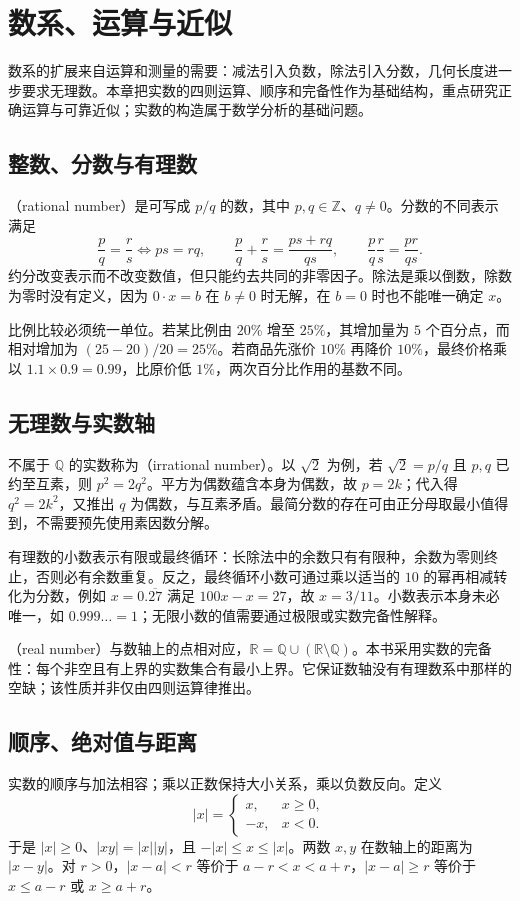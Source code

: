 \documentclass[UTF8]{ctexbook}
\begin{document}
\chapter{数系、运算与近似}
\label{chap:em-numbers}
数系的扩展来自运算和测量的需要：减法引入负数，除法引入分数，几何长度进一步要求无理数。本章把实数的四则运算、顺序和完备性作为基础结构，重点研究正确运算与可靠近似；实数的构造属于数学分析的基础问题。

\section{整数、分数与有理数}
（rational number）是可写成 $p/q$ 的数，其中 $p,q\in\mathbb Z$、$q\ne0$。分数的不同表示满足
\[
 \frac pq=\frac rs\Longleftrightarrow ps=rq,\qquad
 \frac pq+\frac rs=\frac{ps+rq}{qs},\qquad
 \frac pq\frac rs=\frac{pr}{qs}.
\]
约分改变表示而不改变数值，但只能约去共同的非零因子。除法是乘以倒数，除数为零时没有定义，因为 $0\cdot x=b$ 在 $b\ne0$ 时无解，在 $b=0$ 时也不能唯一确定 $x$。

比例比较必须统一单位。若某比例由 $20\%$ 增至 $25\%$，其增加量为 $5$ 个百分点，而相对增加为 $(25-20)/20=25\%$。若商品先涨价 $10\%$ 再降价 $10\%$，最终价格乘以 $1.1\times0.9=0.99$，比原价低 $1\%$，两次百分比作用的基数不同。

\section{无理数与实数轴}
不属于 $\mathbb Q$ 的实数称为（irrational number）。以 $\sqrt2$ 为例，若 $\sqrt2=p/q$ 且 $p,q$ 已约至互素，则 $p^2=2q^2$。平方为偶数蕴含本身为偶数，故 $p=2k$；代入得 $q^2=2k^2$，又推出 $q$ 为偶数，与互素矛盾。最简分数的存在可由正分母取最小值得到，不需要预先使用素因数分解。

有理数的小数表示有限或最终循环：长除法中的余数只有有限种，余数为零则终止，否则必有余数重复。反之，最终循环小数可通过乘以适当的 $10$ 的幂再相减转化为分数，例如 $x=0.\overline{27}$ 满足 $100x-x=27$，故 $x=3/11$。小数表示本身未必唯一，如 $0.999\ldots=1$；无限小数的值需要通过极限或实数完备性解释。

（real number）与数轴上的点相对应，$\mathbb R=\mathbb Q\cup(\mathbb R\setminus\mathbb Q)$。本书采用实数的完备性：每个非空且有上界的实数集合有最小上界。它保证数轴没有有理数系中那样的空缺；该性质并非仅由四则运算律推出。

\section{顺序、绝对值与距离}
实数的顺序与加法相容；乘以正数保持大小关系，乘以负数反向。定义
\[
 |x|=\begin{cases}x,&x\ge0,\\-x,&x<0.\end{cases}
\]
于是 $|x|\ge0$、$|xy|=|x||y|$，且 $-|x|\le x\le|x|$。两数 $x,y$ 在数轴上的距离为 $|x-y|$。对 $r>0$，$|x-a|<r$ 等价于 $a-r<x<a+r$，$|x-a|\ge r$ 等价于 $x\le a-r$ 或 $x\ge a+r$。
\end{document}
